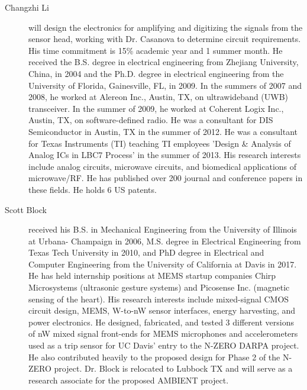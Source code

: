 \begin{description}
  \item[Changzhi Li] will design the electronics for amplifying and digitizing the signals from the sensor head, working with Dr. Casanova to determine circuit requirements. His time commitment is 15\% academic year and 1 summer month. He received the B.S. degree in electrical engineering from Zhejiang University, China, in 2004 and the Ph.D. degree in electrical engineering from the University of Florida, Gainesville, FL, in 2009. In the summers of 2007 and 2008, he worked at Alereon Inc., Austin, TX, on ultrawideband (UWB) transceiver. In the summer of 2009, he worked at Coherent Logix Inc., Austin, TX, on software-defined radio. He was a consultant for DIS Semiconductor in Austin, TX in the summer of 2012. He was a consultant for Texas Instruments (TI) teaching TI employees 'Design \& Analysis of Analog ICs in LBC7 Process' in the summer of 2013. His research interests include analog circuits, microwave circuits, and biomedical applications of microwave/RF. He has published over 200 journal and conference papers in these fields. He holds 6 US patents.
  \item[Scott Block] received his B.S. in Mechanical Engineering from the University of Illinois at Urbana- Champaign in 2006, M.S. degree in Electrical Engineering from Texas Tech University in 2010, and PhD degree in Electrical and Computer Engineering from the University of California at Davis in 2017. He has held internship positions at MEMS startup companies Chirp Microsystems (ultrasonic gesture systems) and Picosense Inc. (magnetic sensing of the heart). His research interests include mixed-signal CMOS circuit design, MEMS, W-to-nW sensor interfaces, energy harvesting, and power electronics. He designed, fabricated, and tested 3 different versions of nW mixed signal front-ends for MEMS microphones and accelerometers used as a trip sensor for UC Davis’ entry to the N-ZERO DARPA project. He also contributed heavily to the proposed design for Phase 2 of the N-ZERO project. Dr. Block is relocated to Lubbock TX and will serve as a research associate for the proposed AMBIENT project.
  
\end{description}
\newpage
{}


